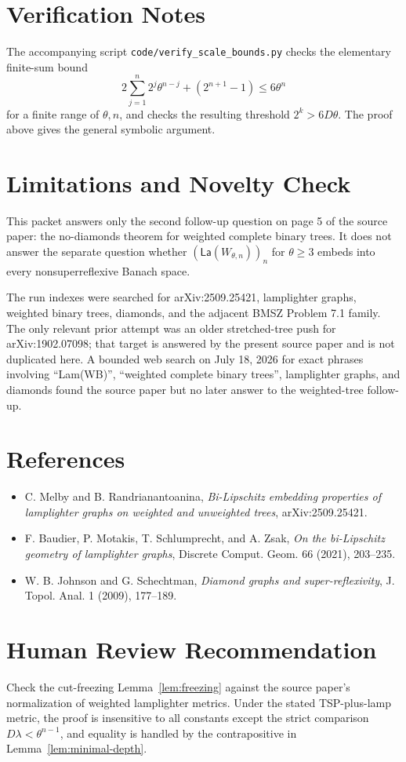 \documentclass[11pt]{article}
\newcommand{\Lam}{\mathsf{La}}
\begin{document}
\section*{Verification Notes}

The accompanying script \texttt{code/verify\_scale\_bounds.py} checks the elementary
finite-sum bound
\[
2\sum_{j=1}^n2^j\theta^{n-j}+(2^{n+1}-1)\leq 6\theta^n
\]
for a finite range of \(\theta,n\), and checks the resulting threshold
\(2^k>6D\theta\). The proof above gives the general symbolic argument.

\section*{Limitations and Novelty Check}

This packet answers only the second follow-up question on page 5 of the source
paper: the no-diamonds theorem for weighted complete binary trees. It does not
answer the separate question whether \((\Lam(W_{\theta,n}))_n\) for
\(\theta\geq 3\) embeds into every nonsuperreflexive Banach space.

The run indexes were searched for arXiv:2509.25421, lamplighter graphs,
weighted binary trees, diamonds, and the adjacent BMSZ Problem 7.1 family. The
only relevant prior attempt was an older stretched-tree push for arXiv:1902.07098;
that target is answered by the present source paper and is not duplicated here.
A bounded web search on July 18, 2026 for exact phrases involving
``Lam(WB)'', ``weighted complete binary trees'', lamplighter graphs, and
diamonds found the source paper but no later answer to the weighted-tree
follow-up.

\section*{References}

\begin{itemize}
\item C. Melby and B. Randrianantoanina, \emph{Bi-Lipschitz embedding
properties of lamplighter graphs on weighted and unweighted trees},
arXiv:2509.25421.
\item F. Baudier, P. Motakis, T. Schlumprecht, and A. Zsak,
\emph{On the bi-Lipschitz geometry of lamplighter graphs}, Discrete Comput.
Geom. 66 (2021), 203--235.
\item W. B. Johnson and G. Schechtman, \emph{Diamond graphs and
super-reflexivity}, J. Topol. Anal. 1 (2009), 177--189.
\end{itemize}

\section*{Human Review Recommendation}

Check the cut-freezing Lemma~\ref{lem:freezing} against the source paper's
normalization of weighted lamplighter metrics. Under the stated TSP-plus-lamp
metric, the proof is insensitive to all constants except the strict comparison
\(D\lambda<\theta^{n-1}\), and equality is handled by the contrapositive in
Lemma~\ref{lem:minimal-depth}.
\end{document}
